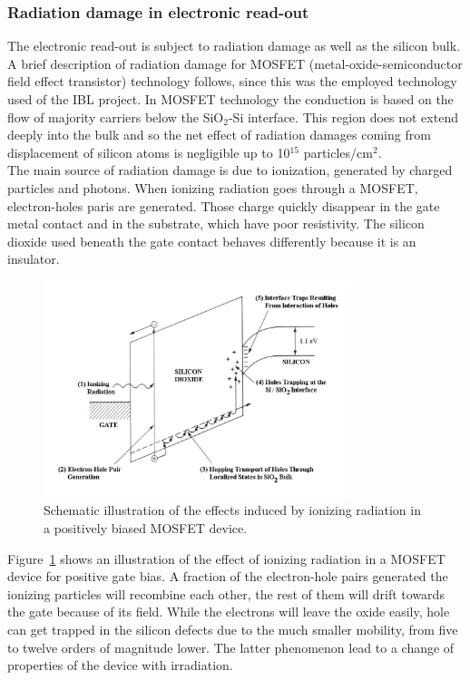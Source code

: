 \subsubsection{Radiation damage in electronic read-out}
The electronic read-out is subject to radiation damage as well as the silicon bulk. A brief description of radiation damage for MOSFET (metal-oxide-semiconductor field effect transistor) technology \cite{MOSFET} follows, since this was the employed technology used of the IBL project.
In MOSFET technology the conduction is based on the flow of majority carriers below the SiO$_2$-Si interface. This region does not extend deeply into the bulk and so the net effect of radiation damages coming from displacement of silicon atoms is negligible up to 10$^{15}$ particles/cm$^2$.\\
The main source of radiation damage is due to ionization, generated by charged particles and photons. When ionizing radiation goes through a MOSFET, electron-holes paris are generated. Those charge quickly disappear in the gate metal contact and in the substrate, which have poor resistivity. The silicon dioxide used beneath the gate contact behaves differently because it is an insulator. 
\begin{figure}
\centering
\includegraphics[width=0.8\textwidth]{Images/tracking_det/TID_damage.png}
\caption{Schematic illustration of the effects induced by ionizing radiation in a positively biased MOSFET device.}
\label{pic:MOSFET_rad_dam}
\end{figure}
Figure~\ref{pic:MOSFET_rad_dam} shows an illustration of the effect of ionizing radiation in a MOSFET device for positive gate bias. A fraction of the electron-hole pairs generated the ionizing particles will recombine each other, the rest of them will drift towards the gate because of its field. While the electrons will leave the oxide easily, hole can get trapped in the silicon defects due to the much smaller mobility, from five to twelve orders of magnitude lower. The latter phenomenon lead to a change of properties of the device with irradiation.\\
